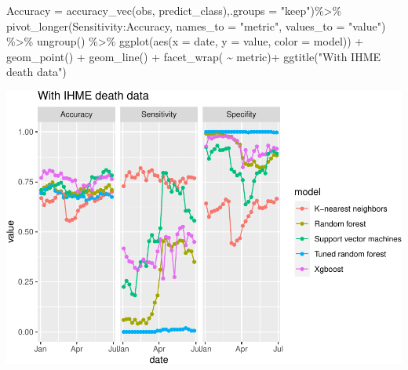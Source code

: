 \documentclass[
]{article}
\newenvironment{Shaded}{\begin{snugshade}}{\end{snugshade}}
\newcommand{\AttributeTok}[1]{\textcolor[rgb]{0.77,0.63,0.00}{#1}}
\newcommand{\FunctionTok}[1]{\textcolor[rgb]{0.00,0.00,0.00}{#1}}
\newcommand{\NormalTok}[1]{#1}
\newcommand{\SpecialCharTok}[1]{\textcolor[rgb]{0.00,0.00,0.00}{#1}}
\newcommand{\StringTok}[1]{\textcolor[rgb]{0.31,0.60,0.02}{#1}}
\begin{document}
\begin{Shaded}
\begin{Highlighting}[]
            \AttributeTok{Accuracy =} \FunctionTok{accuracy\_vec}\NormalTok{(obs, predict\_class),}\AttributeTok{.groups =} \StringTok{"keep"}\NormalTok{)}\SpecialCharTok{\%\textgreater{}\%}
  \FunctionTok{pivot\_longer}\NormalTok{(Sensitivity}\SpecialCharTok{:}\NormalTok{Accuracy, }\AttributeTok{names\_to =} \StringTok{"metric"}\NormalTok{, }\AttributeTok{values\_to =} \StringTok{"value"}\NormalTok{) }\SpecialCharTok{\%\textgreater{}\%}
  \FunctionTok{ungroup}\NormalTok{() }\SpecialCharTok{\%\textgreater{}\%}
  \FunctionTok{ggplot}\NormalTok{(}\FunctionTok{aes}\NormalTok{(}\AttributeTok{x =}\NormalTok{ date, }\AttributeTok{y =}\NormalTok{ value, }\AttributeTok{color =}\NormalTok{ model)) }\SpecialCharTok{+}
  \FunctionTok{geom\_point}\NormalTok{() }\SpecialCharTok{+}
  \FunctionTok{geom\_line}\NormalTok{() }\SpecialCharTok{+}
  \FunctionTok{facet\_wrap}\NormalTok{( }\SpecialCharTok{\textasciitilde{}}\NormalTok{ metric)}\SpecialCharTok{+}
  \FunctionTok{ggtitle}\NormalTok{(}\StringTok{"With IHME death data"}\NormalTok{)}
\end{Highlighting}
\end{Shaded}

\includegraphics{figures/report/fig-unnamed-chunk-82-1.pdf}
\end{document}
